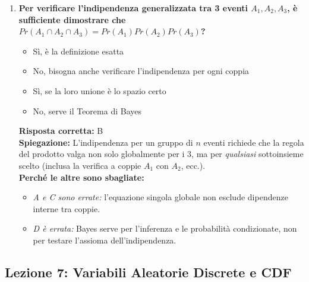 \documentclass[12pt, a4paper]{article}
\begin{document}
\begin{enumerate}[label=\textbf{\arabic*.}]
    \item \textbf{Per verificare l'indipendenza generalizzata tra 3 eventi $A_1, A_2, A_3$, è sufficiente dimostrare che $Pr(A_1 \cap A_2 \cap A_3) = Pr(A_1)Pr(A_2)Pr(A_3)$?}
    \begin{itemize}
        \item[A)] Sì, è la definizione esatta
        \item[B)] No, bisogna anche verificare l'indipendenza per ogni coppia
        \item[C)] Sì, se la loro unione è lo spazio certo
        \item[D)] No, serve il Teorema di Bayes
    \end{itemize}
    \textbf{Risposta corretta:} B \\
    \textbf{Spiegazione:} L'indipendenza per un gruppo di $n$ eventi richiede che la regola del prodotto valga non solo globalmente per i 3, ma per \textit{qualsiasi} sottoinsieme scelto (inclusa la verifica a coppie $A_1$ con $A_2$, ecc.). \\
    \textbf{Perché le altre sono sbagliate:}
    \begin{itemize}
        \item \textit{A e C sono errate:} l'equazione singola globale non esclude dipendenze interne tra coppie.
        \item \textit{D è errata:} Bayes serve per l'inferenza e le probabilità condizionate, non per testare l'assioma dell'indipendenza.
    \end{itemize}
\end{enumerate}

\subsection*{Lezione 7: Variabili Aleatorie Discrete e CDF}
\end{document}
